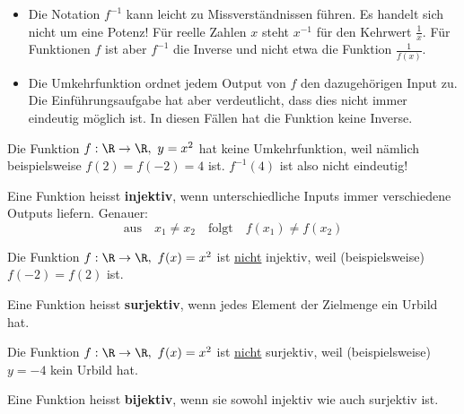 \begin{itemize}
    \item Die Notation $f^{-1}$ kann leicht zu Missverständnissen führen. Es handelt sich nicht um eine Potenz! Für reelle Zahlen $x$ steht $x^{-1}$ für den Kehrwert $\frac{1}{x}$. Für Funktionen $f$ ist aber $f^{-1}$ die Inverse und nicht etwa die Funktion $\frac{1}{f(x)}$.
    \item Die Umkehrfunktion ordnet jedem Output von $f$ den dazugehörigen Input zu. Die Einführungsaufgabe hat aber verdeutlicht, dass dies nicht immer eindeutig möglich ist. In diesen Fällen hat die Funktion keine Inverse.
\end{itemize}
\begin{example}
    Die Funktion $f: \R \to \R,\ y=x^2$ hat keine Umkehrfunktion, weil nämlich beispielsweise $f(2)=f(-2)=4$ ist. $f^{-1}(4)$ ist also nicht eindeutig!
\end{example}
\begin{deff}[Injektivität]{}
    Eine Funktion heisst \textbf{injektiv}, wenn unterschiedliche Inputs immer verschiedene Outputs liefern. Genauer:
    \[\text{aus} \quad x_1\neq x_2 \quad \text{folgt} \quad f(x_1)\neq f(x_2)\]
\end{deff}
\begin{example}
    Die Funktion $f: \R \to \R,\ f(x)=x^2$ ist \underline{nicht} injektiv, weil (beispielsweise) $f(-2) =f(2)$ ist.
\end{example}
\begin{deff}[Surjektivität]{}
    Eine Funktion heisst \textbf{surjektiv}, wenn jedes Element der Zielmenge ein Urbild hat.
\end{deff}
\begin{example}
    Die Funktion $f: \R \to \R,\ f(x)=x^2$ ist \underline{nicht} surjektiv, weil (beispielsweise) $y=-4$ kein Urbild hat.
\end{example}
\begin{deff}[Bijektivität]{}
    Eine Funktion heisst \textbf{bijektiv}, wenn sie sowohl injektiv wie auch surjektiv ist.
\end{deff}
\begin{minipage}{0.48\linewidth}
\end{minipage}
